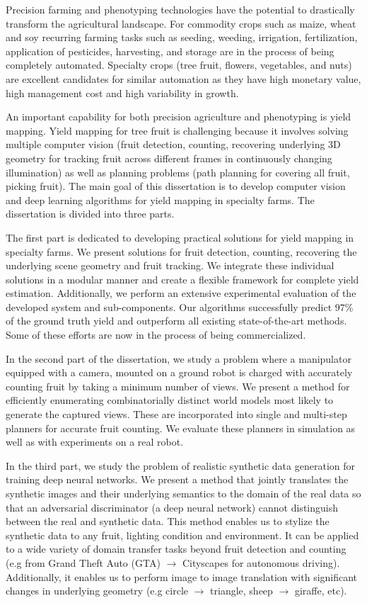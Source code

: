 Precision farming and phenotyping technologies have the potential to drastically transform the agricultural landscape. For commodity crops such as maize, wheat and soy recurring farming tasks such as seeding, weeding, irrigation, fertilization, application of pesticides, harvesting, and storage are in the process of being completely automated. Specialty crops (tree fruit, flowers, vegetables, and nuts) are excellent candidates for similar automation as they have high monetary value, high management cost and high variability in growth. 

An important capability for both precision agriculture and phenotyping is yield mapping. Yield mapping for tree fruit is challenging because it involves solving multiple computer vision (fruit detection,  counting, recovering underlying 3D geometry for tracking fruit across different frames in continuously changing illumination) as well as planning problems (path planning for covering all fruit, picking fruit). The main goal of this dissertation is to develop computer vision and deep learning algorithms for yield mapping in specialty farms. The dissertation is divided into three parts.

The first part is dedicated to developing practical solutions for yield mapping in specialty farms. We present solutions for fruit detection, counting, recovering the underlying scene geometry and fruit tracking. We integrate these individual solutions in a modular manner and create a flexible framework for complete yield estimation. Additionally, we perform an extensive experimental evaluation of the developed system and sub-components. Our algorithms successfully predict $97\%$ of the ground truth yield and outperform all existing state-of-the-art methods. Some of these efforts are now in the process of being commercialized.

In the second part of the dissertation, we study a problem where a manipulator equipped with a camera, mounted on a ground robot is charged with accurately counting fruit by taking a minimum number of views. We present a method for efficiently enumerating combinatorially distinct world models most likely to generate the captured views. These are incorporated into single and multi-step planners for accurate fruit counting. We evaluate these planners in simulation as well as with experiments on a real robot.

In the third part, we study the problem of realistic synthetic data generation for training deep neural networks. We present a method that jointly translates the synthetic images and their underlying semantics to the domain of the real data so that an adversarial discriminator (a deep neural network) cannot distinguish between the real and synthetic data. This method enables us to stylize the synthetic data to any fruit, lighting condition and environment. It can be applied to a wide variety of domain transfer tasks beyond fruit detection and counting (e.g from Grand Theft Auto (GTA) $\to$ Cityscapes for autonomous driving).  Additionally, it enables us to perform image to image translation with significant changes in underlying geometry (e.g circle $\to$ triangle, sheep $\to$ giraffe, etc).


